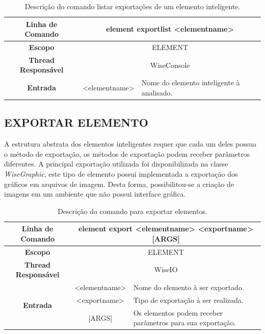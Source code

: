 \begin{center}
	\begin{table}[!htbp]
		\begin{tabularx}{\textwidth}{c|c|X}
			\toprule
			\textbf{Linha de Comando} & \multicolumn{2}{c}{element export\underline{\space\space}list <element\underline{\space\space}name>}  \\
			\midrule
			\textbf{Escopo} & \multicolumn{2}{c}{ELEMENT} \\
			\hline
			\textbf{Thread Responsável} & \multicolumn{2}{c}{WiseConsole} \\
			\hline
			\textbf{Entrada} & <element\underline{\space\space}name> & Nome do elemento inteligente à analisado. \\
			\bottomrule
		\end{tabularx}
		\caption{Descrição do comando listar exportações de um elemento inteligente.}
		\label{tab:export_list_element}
	\end{table}
\end{center}

\subsection{EXPORTAR ELEMENTO}\label{sec:export_element}

A estrutura abstrata dos elementos inteligentes requer que cada um deles possua o método de exportação, os métodos de exportação podem receber parâmetros diferentes. A principal exportação utilizada foi disponibilizada na classe \textit{WiseGraphic}, este tipo de elemento possui implementada a exportação dos gráficos em arquivos de imagem. Desta forma, possibilitou-se a criação de imagens em um ambiente que não possui interface gráfica.

\begin{center}
	\begin{table}[!htbp]
		\begin{tabularx}{\textwidth}{c|c|X}
			\toprule
			\textbf{Linha de Comando} & \multicolumn{2}{c}{element export <element\underline{\space\space}name> <export\underline{\space\space}name> [ARGS]} \\
			\midrule
			\textbf{Escopo} & \multicolumn{2}{c}{ELEMENT} \\
			\hline
			\textbf{Thread Responsável} & \multicolumn{2}{c}{WiseIO} \\
			\hline
			\multirow{3}{*}{\textbf{Entrada}} & <element\underline{\space\space}name> & Nome do elemento à ser exportado. \\
			& <export\underline{\space\space}name> & Tipo de exportação à ser realizada. \\
			& [ARGS] & Os elementos podem receber parâmetros para sua exportação. \\
			\bottomrule
		\end{tabularx}
		\caption{Descrição do comando para exportar elementos.}
		\label{tab:export}
	\end{table}
\end{center}

